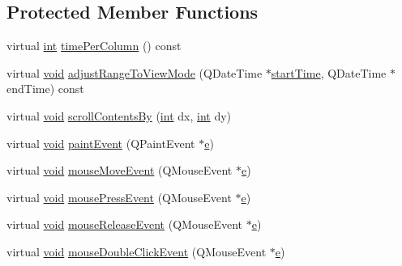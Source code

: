 \subsection*{Protected Member Functions}
\begin{DoxyCompactItemize}
\item 
virtual \hyperlink{ioapi_8h_a787fa3cf048117ba7123753c1e74fcd6}{int} \hyperlink{class_qxt_schedule_view_a7930f1999f07088813554247cd7acee7}{time\-Per\-Column} () const 
\item 
virtual \hyperlink{group___u_a_v_objects_plugin_ga444cf2ff3f0ecbe028adce838d373f5c}{void} \hyperlink{class_qxt_schedule_view_ac27562bad8b04bb78a3cc455e103a10e}{adjust\-Range\-To\-View\-Mode} (Q\-Date\-Time $\ast$\hyperlink{uavobjecttemplate_8m_a9927793f1f69327ecd9ebf938e0deb92}{start\-Time}, Q\-Date\-Time $\ast$end\-Time) const 
\item 
virtual \hyperlink{group___u_a_v_objects_plugin_ga444cf2ff3f0ecbe028adce838d373f5c}{void} \hyperlink{class_qxt_schedule_view_aee04266a32ffbc9992bd9e268c74c4ce}{scroll\-Contents\-By} (\hyperlink{ioapi_8h_a787fa3cf048117ba7123753c1e74fcd6}{int} dx, \hyperlink{ioapi_8h_a787fa3cf048117ba7123753c1e74fcd6}{int} dy)
\item 
virtual \hyperlink{group___u_a_v_objects_plugin_ga444cf2ff3f0ecbe028adce838d373f5c}{void} \hyperlink{class_qxt_schedule_view_ad8522d31914a6426e9a73072f05bdad2}{paint\-Event} (Q\-Paint\-Event $\ast$\hyperlink{_o_p_plots_8m_a9425be9aab51621e317ba7ade564b570}{e})
\item 
virtual \hyperlink{group___u_a_v_objects_plugin_ga444cf2ff3f0ecbe028adce838d373f5c}{void} \hyperlink{class_qxt_schedule_view_a66cc33d01f18bce290b8be027aab57e6}{mouse\-Move\-Event} (Q\-Mouse\-Event $\ast$\hyperlink{_o_p_plots_8m_a9425be9aab51621e317ba7ade564b570}{e})
\item 
virtual \hyperlink{group___u_a_v_objects_plugin_ga444cf2ff3f0ecbe028adce838d373f5c}{void} \hyperlink{class_qxt_schedule_view_a356ddf233d16be80e6312b0f0e0011f4}{mouse\-Press\-Event} (Q\-Mouse\-Event $\ast$\hyperlink{_o_p_plots_8m_a9425be9aab51621e317ba7ade564b570}{e})
\item 
virtual \hyperlink{group___u_a_v_objects_plugin_ga444cf2ff3f0ecbe028adce838d373f5c}{void} \hyperlink{class_qxt_schedule_view_a9de860b7a297a4b5a0cdac5704dcc36a}{mouse\-Release\-Event} (Q\-Mouse\-Event $\ast$\hyperlink{_o_p_plots_8m_a9425be9aab51621e317ba7ade564b570}{e})
\item 
virtual \hyperlink{group___u_a_v_objects_plugin_ga444cf2ff3f0ecbe028adce838d373f5c}{void} \hyperlink{class_qxt_schedule_view_af82fe7b5d272414b66f9408681c8553d}{mouse\-Double\-Click\-Event} (Q\-Mouse\-Event $\ast$\hyperlink{_o_p_plots_8m_a9425be9aab51621e317ba7ade564b570}{e})

\end{DoxyCompactItemize}
